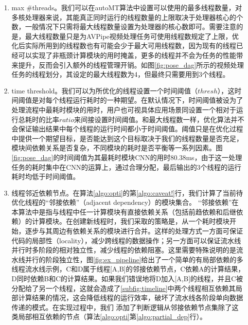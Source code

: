 \begin{enumerate}[wide]
    \item max \#threads。我们可以在autoMT算法中设置可以使用的最多线程数量，对多核处理器来说，其能真正同时运行的线程数量的上限取决于处理器核心的个数，一般情况下只需将最大线程数量设置为处理器的核心数即可。需要注意的是，最大线程数量只是为AVPipe视频处理任务可使用线程数规定了上限，优化后实际所用到的线程数也有可能会少于最大可用线程数，因为现有的线程已经可以实现了非瓶颈计算模块的用时掩盖，更多的线程并不会为任务的性能带来提升，反而会引入额外的线程管理开销。如图\ref{fig:pose_dag}所示的视频处理任务的线程划分，其设定的最大线程数为4，但最终只需要用到3个线程。
    
    \item time threshold。我们可以为所优化的线程设置一个时间阈值（$thresh$），这时间阈值是对每个线程运行耗时的一种期望。在默认情况下，时间阈值被设为了处理流程中最耗时模块的用时，用户也可视具体应用场景同设置一个相对于运行总耗时的比率$ratio$来间接设置时间阈值。和最大线程数一样，优化算法并不会保证输出结果中每个线程的运行时间都小于时间阈值。阈值只是在优化过程中提供一个期望目标，是否能达到这个目标取决于我们的线程数量是否充足，模块间依赖关系是否复杂，不同模块的耗时是否平衡等一系列因素。图\ref{fig:pose_dag}的时间阈值为其最耗时模块CNN的用时80.38ms，由于这一处理任务的耗时集中在CNN的运算上，通过合理分配，最后输出的3个线程的运行耗时均低于时间阈值。
    
    \item 线程邻近依赖节点。在算法\ref{algo:opti}的第\ref{algo:caveat!}行，我们计算了当前待优化线程的“邻接依赖”（adjacent dependency）的模块集合。%
    “邻接依赖”在本算法中是指与线程中任一计算模块有直接依赖关系（包括前趋依赖和后继依赖）的计算模块。在创建新线程时，我们采取的策略是，从一个耗时模块开始，逐步与其周边有依赖关系的模块进行合并。这样的处理方式一方面可保证代码的局部性（locality），减少跨线程的数据操作；另一方面可以保证流水线并行时多阶段的相对独立性，减少线程的依赖阻塞。这里需要特殊说明的是流水线并行的阶段独立性，图\ref{fig:ex_pipeline}给出了一个简单的有局部依赖的多线程流水线示例，C和D属于线程[A,B]的邻接依赖节点，C依赖A的计算结果，D同时依赖B和C的计算结果。如果我们错误地将D加入[A,B]的线程，并且C被分配给了另一个线程，这就会造成了\ref{subfig:timeline}中两个线程相互依赖其局部计算结果的情况，这会降低线程的运行效率，破坏了流水线各阶段单向数据传递的模式。在实现过程中，我们
   添加了判断逻辑从邻接依赖节点集除了这类局部相互依赖的节点（算法\ref{algo:opti}第\ref{algo:partial_dep}行）。
\end{enumerate}


